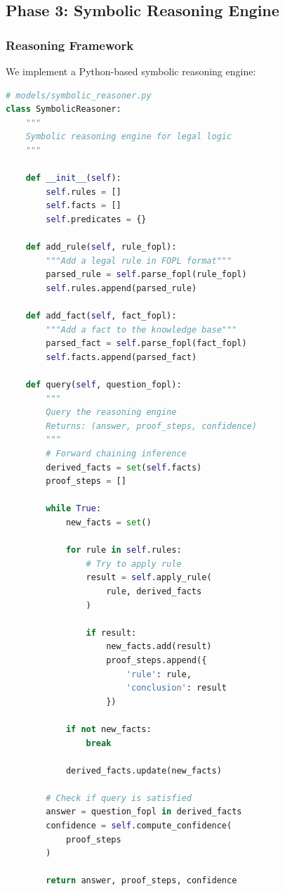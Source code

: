 \documentclass[12pt,a4paper]{article}
\begin{document}
\subsection{Phase 3: Symbolic Reasoning Engine}

\subsubsection{Reasoning Framework}

We implement a Python-based symbolic reasoning engine:

\begin{lstlisting}[language=Python, caption=Symbolic Reasoner Implementation]
# models/symbolic_reasoner.py
class SymbolicReasoner:
    """
    Symbolic reasoning engine for legal logic
    """
    
    def __init__(self):
        self.rules = []
        self.facts = []
        self.predicates = {}
    
    def add_rule(self, rule_fopl):
        """Add a legal rule in FOPL format"""
        parsed_rule = self.parse_fopl(rule_fopl)
        self.rules.append(parsed_rule)
    
    def add_fact(self, fact_fopl):
        """Add a fact to the knowledge base"""
        parsed_fact = self.parse_fopl(fact_fopl)
        self.facts.append(parsed_fact)
    
    def query(self, question_fopl):
        """
        Query the reasoning engine
        Returns: (answer, proof_steps, confidence)
        """
        # Forward chaining inference
        derived_facts = set(self.facts)
        proof_steps = []
        
        while True:
            new_facts = set()
            
            for rule in self.rules:
                # Try to apply rule
                result = self.apply_rule(
                    rule, derived_facts
                )
                
                if result:
                    new_facts.add(result)
                    proof_steps.append({
                        'rule': rule,
                        'conclusion': result
                    })
            
            if not new_facts:
                break
            
            derived_facts.update(new_facts)
        
        # Check if query is satisfied
        answer = question_fopl in derived_facts
        confidence = self.compute_confidence(
            proof_steps
        )
        
        return answer, proof_steps, confidence
\end{lstlisting}
\end{document}
